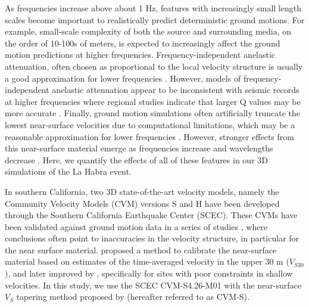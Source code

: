 As frequencies increase above about 1 Hz, features with increasingly small length scales become important to realistically predict deterministic ground motions. For example, small-scale complexity of both the source and surrounding media, on the order of 10-100s of meters, is expected to increasingly affect the ground motion predictions at higher frequencies. Frequency-independent anelastic attenuation, often chosen as proportional to the local velocity structure  is usually a good approximation for lower frequencies \citep[e.g., up to ~1 Hz][]{liu1976velocity,fehler1992separation}. However, models of frequency-independent anelastic attenuation appear to be inconsistent with seismic records at higher frequencies where regional studies indicate that larger Q values may be more accurate . Finally, ground motion simulations often artificially truncate the lowest near-surface velocities due to computational limitations, which may be a reasonable approximation for lower frequencies . However, stronger effects from this near-surface material emerge as frequencies increase and wavelengths decrease . Here, we quantify the effects of all of these features in our 3D simulations of the La Habra event.

In southern California, two 3D state-of-the-art velocity models, namely the Community Velocity Models (CVM) versions S and H have been developed through the Southern California Earthquake Center (SCEC). These CVMs have been validated against ground motion data in a series of studies , where conclusions often point to inaccuracies in the velocity structure, in particular for the near surface material. \citet{elyVs30derivedNearsurfaceSeismic2010} proposed a method to calibrate the near-surface material based on estimates of the time-averaged velocity in the upper 30 m ($V_{S30}$), and later improved by \citet{huCalibrationNearsurfaceSeismic2021}, specifically for sites with poor constraints in shallow velocities. In this study, we use the SCEC CVM-S4.26-M01 with the near-surface $V_S$ tapering method proposed by \citet{huCalibrationNearsurfaceSeismic2021} (hereafter referred to as CVM-S).

